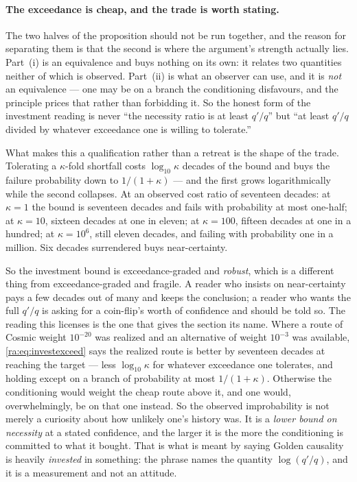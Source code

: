 \documentclass[11pt]{article}
\numberwithin{equation}{section}
\theoremstyle{plain}
\theoremstyle{definition}
\theoremstyle{remark}
\begin{document}
\paragraph{The exceedance is cheap, and the trade is worth stating.}\label{ra:rem:investkappa}
The two halves of the proposition should not be run together, and the
reason for separating them is that the second is where the argument's
strength actually lies. Part~(i) is an equivalence and buys nothing on its own: it relates two
quantities neither of which is observed. Part~(ii) is what an observer
can use, and it is \emph{not} an equivalence --- one may be on a branch
the conditioning disfavours, and the principle prices that rather than
forbidding it. So the honest form of the investment reading is never
``the necessity ratio is at least $q'/q$'' but ``at least $q'/q$ divided
by whatever exceedance one is willing to tolerate.''

What makes this a qualification rather than a retreat is the shape of the
trade. Tolerating a $\kappa$-fold shortfall costs $\log_{10}\kappa$
decades of the bound and buys the failure probability down to
$1/(1+\kappa)$ --- and the first grows logarithmically while the second
collapses. At an observed cost ratio of seventeen decades: at
$\kappa=1$ the bound is seventeen decades and fails with probability at
most one-half; at $\kappa=10$, sixteen decades at one in eleven; at
$\kappa=100$, fifteen decades at one in a hundred; at $\kappa=10^{6}$,
still eleven decades, and failing with probability one in a million. Six
decades surrendered buys near-certainty.

So the investment bound is exceedance-graded and \emph{robust}, which is
a different thing from exceedance-graded and fragile. A reader who
insists on near-certainty pays a few decades out of many and keeps the
conclusion; a reader who wants the full $q'/q$ is asking for a
coin-flip's worth of confidence and should be told so. The reading this licenses is the one that gives the section its name.
Where a route of Cosmic weight $10^{-20}$ was realized and an alternative
of weight $10^{-3}$ was available, \eqref{ra:eq:investexceed} says the
realized route is better by seventeen decades at reaching the target ---
less $\log_{10}\kappa$ for whatever exceedance one tolerates, and holding
except on a branch of probability at most $1/(1+\kappa)$. Otherwise the
conditioning would weight the cheap route above it, and one would,
overwhelmingly, be on that one instead. So the observed
improbability is not merely a curiosity about how unlikely one's history
was. It is a \emph{lower bound on necessity} at a stated confidence, and the
larger it is the more the conditioning is committed to what it bought. That is what is
meant by saying Golden causality is heavily \emph{invested} in something:
the phrase names the quantity $\log(q'/q)$, and it is a measurement and
not an attitude.
\end{document}
